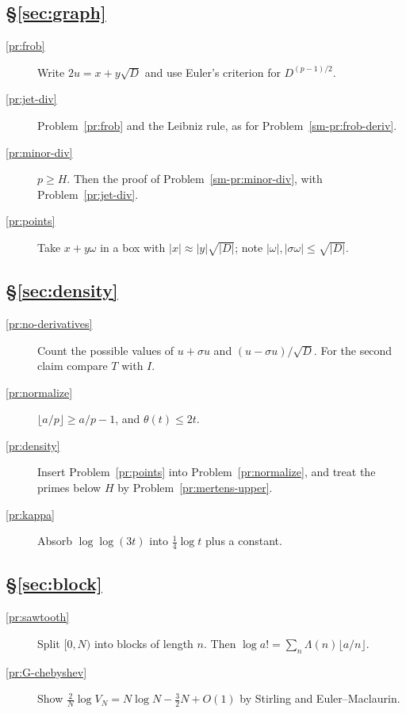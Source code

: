 \documentclass[reqno]{amsart}
\theoremstyle{definition}
\theoremstyle{plain}
\begin{document}
\subsection*{\S\ref{sec:graph}}
\begin{description}
\item[\ref{pr:frob}] Write \(2u = x + y\sqrt D\) and use Euler's criterion for \(D^{(p-1)/2}\).
\item[\ref{pr:jet-div}] Problem~\ref{pr:frob} and the Leibniz rule, as for Problem~\ref{sm-pr:frob-deriv}.
\item[\ref{pr:minor-div}] \(p \ge H\).  Then the proof of Problem~\ref{sm-pr:minor-div}, with Problem~\ref{pr:jet-div}.
\item[\ref{pr:points}] Take \(x + y\omega\) in a box with \(\lvert x \rvert \approx \lvert y \rvert \sqrt{\lvert D \rvert}\); note \(\lvert \omega \rvert, \lvert \sigma\omega \rvert \le \sqrt{\lvert D \rvert}\).
\end{description}

\subsection*{\S\ref{sec:density}}
\begin{description}
\item[\ref{pr:no-derivatives}] Count the possible values of \(u + \sigma u\) and \((u - \sigma u)/\sqrt D\).  For the second claim compare \(T\) with \(I\).
\item[\ref{pr:normalize}] \(\lfloor a/p \rfloor \ge a/p - 1\), and \(\theta(t) \le 2t\).
\item[\ref{pr:density}] Insert Problem~\ref{pr:points} into Problem~\ref{pr:normalize}, and treat the primes below \(H\) by Problem~\ref{pr:mertens-upper}.
\item[\ref{pr:kappa}] Absorb \(\log\log(3t)\) into \(\frac14\log t\) plus a constant.
\end{description}

\subsection*{\S\ref{sec:block}}
\begin{description}
\item[\ref{pr:sawtooth}] Split \([0, N)\) into blocks of length \(n\).  Then \(\log a! = \sum_n \Lambda(n)\lfloor a/n \rfloor\).
\item[\ref{pr:G-chebyshev}] Show \(\frac2N \log V_N = N\log N - \frac32 N + O(1)\) by Stirling and Euler--Maclaurin.
\end{description}
\end{document}
